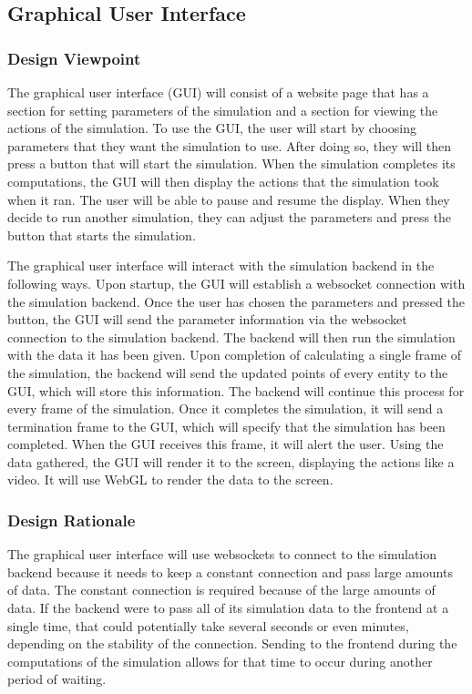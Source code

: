 \documentclass[onecolumn, draftclsnofoot,10pt, compsoc]{IEEEtran}
\begin{document}
\subsection{Graphical User Interface}
\subsubsection{Design Viewpoint}
The graphical user interface (GUI) will consist of a website page that has a section for setting parameters of the simulation and a section for viewing the actions of the simulation.
To use the GUI, the user will start by choosing parameters that they want the simulation to use.
After doing so, they will then press a button that will start the simulation.
When the simulation completes its computations, the GUI will then display the actions that the simulation took when it ran.
The user will be able to pause and resume the display.
When they decide to run another simulation, they can adjust the parameters and press the button that starts the simulation.

The graphical user interface will interact with the simulation backend in the following ways.
Upon startup, the GUI will establish a websocket connection with the simulation backend.
Once the user has chosen the parameters and pressed the button, the GUI will send the parameter information via the websocket connection to the simulation backend.
The backend will then run the simulation with the data it has been given.
Upon completion of calculating a single frame of the simulation, the backend will send the updated points of every entity to the GUI, which will store this information.
The backend will continue this process for every frame of the simulation.
Once it completes the simulation, it will send a termination frame to the GUI, which will specify that the simulation has been completed.
When the GUI receives this frame, it will alert the user.
Using the data gathered, the GUI will render it to the screen, displaying the actions like a video.
It will use WebGL to render the data to the screen.
\subsubsection{Design Rationale}
The graphical user interface will use websockets to connect to the simulation backend because it needs to keep a constant connection and pass large amounts of data.
The constant connection is required because of the large amounts of data.
If the backend were to pass all of its simulation data to the frontend at a single time, that could potentially take several seconds or even minutes, depending on the stability of the connection.
Sending to the frontend during the computations of the simulation allows for that time to occur during another period of waiting.
\end{document}
